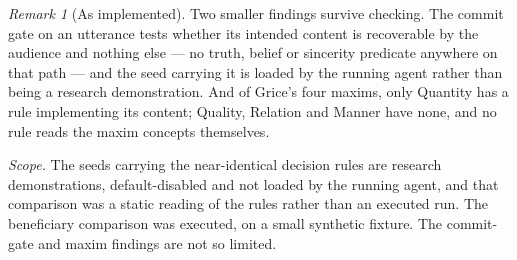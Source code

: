 \documentclass[11pt,a4paper]{article}
\theoremstyle{remark}\newtheorem{remark}[definition]{Remark}
\begin{document}
\begin{remark}[As implemented]
Two smaller findings survive checking. The commit gate on an utterance tests whether its intended
content is recoverable by the audience and nothing else --- no truth, belief or sincerity predicate
anywhere on that path --- and the seed carrying it is loaded by the running agent rather than being a
research demonstration. And of Grice's four maxims, only Quantity has a rule implementing its content;
Quality, Relation and Manner have none, and no rule reads the maxim concepts themselves.

\emph{Scope.} The seeds carrying the near-identical decision rules are research demonstrations,
default-disabled and not loaded by the running agent, and that comparison was a static reading of the
rules rather than an executed run. The beneficiary comparison was executed, on a small synthetic
fixture. The commit-gate and maxim findings are not so limited.
\end{remark}
\end{document}
